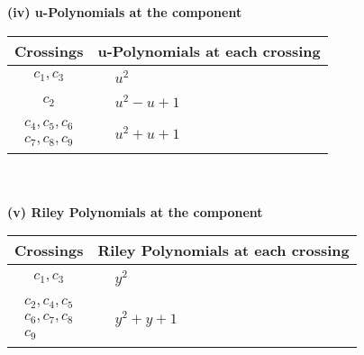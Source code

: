 \documentclass[1p]{elsarticle_modified}
\theoremstyle{definition}
\begin{document}
\newpage\renewcommand{\arraystretch}{1}
\flushleft \textbf{(iv) u-Polynomials at the component}\newline \\
\begin{tabular}{m{50pt}|m{274pt}}
Crossings & \hspace{64pt}u-Polynomials at each crossing \\
\hline $$\begin{aligned}c_{1},c_{3}\end{aligned}$$&$\begin{aligned}
&u^2
\end{aligned}$\\
\hline $$\begin{aligned}c_{2}\end{aligned}$$&$\begin{aligned}
&u^2- u+1
\end{aligned}$\\
\hline $$\begin{aligned}c_{4},c_{5},c_{6}\\c_{7},c_{8},c_{9}\end{aligned}$$&$\begin{aligned}
&u^2+u+1
\end{aligned}$\\
\hline
\end{tabular}\\~\\
\newpage\renewcommand{\arraystretch}{1}
\flushleft \textbf{(v) Riley Polynomials at the component}\newline \\
\begin{tabular}{m{50pt}|m{274pt}}
Crossings & \hspace{64pt}Riley Polynomials at each crossing \\
\hline $$\begin{aligned}c_{1},c_{3}\end{aligned}$$&$\begin{aligned}
&y^2
\end{aligned}$\\
\hline $$\begin{aligned}c_{2},c_{4},c_{5}\\c_{6},c_{7},c_{8}\\c_{9}\end{aligned}$$&$\begin{aligned}
&y^2+y+1
\end{aligned}$\\
\hline
\end{tabular}\\~\\
\end{document}
